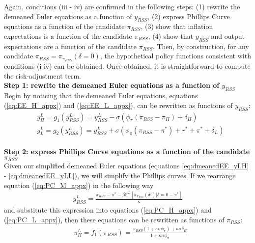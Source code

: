 \documentclass[11pt]{article}
\begin{document}
\begin{singlespace}
		Again, conditions (iii - iv) are confirmed in the following steps: (1) rewrite the demeaned Euler equations as a function of $y_{RSS}$, (2) express Phillips Curve equations as a function of the candidate $\pi_{RSS}$, (3) show that inflation expectations is a function of the candidate $\pi_{RSS}$, (4) show that  $y_{RSS}$ and output expectations are a function of the candidate $\pi_{RSS}$. Then, by construction, for any candidate $\pi_{RSS} = \pi_{\pi_{RSS}}(\delta=0)$, the hypothetical policy functions consistent with conditions (i-iv) can be obtained. Once obtained, it is straightforward to compute the risk-adjustment term. %
		\\
		\noindent \textbf{Step 1: rewrite the demeaned Euler equations as a function of $y_{RSS}$}\\
		Begin by noticing that the demeaned Euler equations, equations (\ref{eq:EE_H_appx}) and (\ref{eq:EE_L_appx}), can be rewritten as functions of $y_{RSS}$:
		\begin{align}
		& y^{L}_{H} = g_1(y^{L}_{RSS}) = y^{L}_{RSS} - \sigma\left(\phi_{\pi}(\pi_{RSS} - \pi_{H}) + \delta_{H}\right) \label{eq:dmeanedEE_yLH} \\
		& y^{L}_{L} = g_2(y^{L}_{RSS})= y^{L}_{RSS} + \sigma\left(\phi_{\pi}(\pi_{RSS} - \pi^*) + r^* + \pi^* + \delta_{L} \right)  \label{eq:dmeanedEE_yLL}
		\end{align}
		\\
		\noindent \textbf{Step 2: express Phillips Curve equations as a function of the candidate $\pi_{RSS}$}\\
		Given our simplified demeaned Euler equations (equations \ref{eq:dmeanedEE_yLH} - \ref{eq:dmeanedEE_yLL}), we will simplify the Phillips curves. If we rearrange equation (\ref{eq:PC_M_appx}) in the following way
		\begin{align}
		y_{RSS}^{L} = \frac{\pi_{RSS} - \pi^* - \beta\mathbb{E}^{L}\left[\pi_{\pi_{RSS}}(\delta')|\delta=0 - \pi^*\right]}{\kappa} \label{eq:yLRSS}
		\end{align}
		and substitute this expression into equations (\ref{eq:PC_H_appx}) and (\ref{eq:PC_L_appx}), then these equations can be rewritten as functions of $\pi_{RSS}$:
		\begin{align}
		& \pi^{L}_{H} = f_1(\pi_{RSS}) =  \frac{\pi_{RSS}(1+ \kappa\sigma\phi_{\pi}) + \kappa\sigma \delta_{H}}{1+\kappa\sigma\phi_{\pi}}\\

\end{align}
\end{singlespace}
\end{document}
